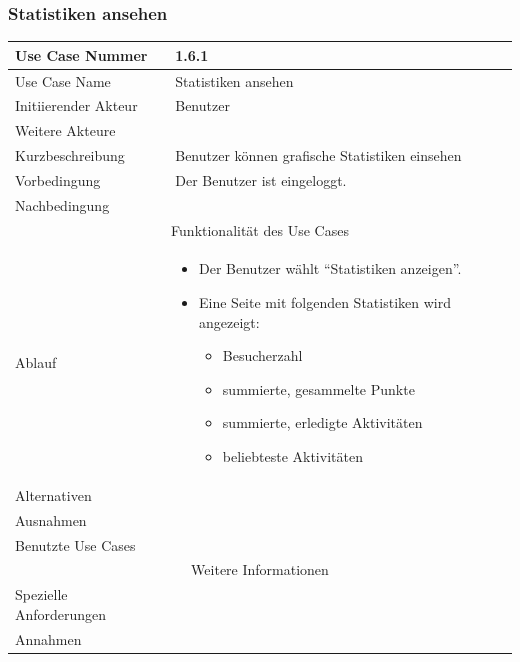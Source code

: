 \documentclass[10pt,a4paper]{article}
\begin{document}
\subsubsection{Statistiken ansehen}
	\begin{tabular}{|l|p{.5\linewidth}|}
	\hline Use Case Nummer & 1.6.1\\ 
	\hline Use Case Name & Statistiken ansehen \\ 
	\hline Initiierender Akteur & Benutzer \\
	\hline Weitere Akteure &  \\
	\hline Kurzbeschreibung & Benutzer können grafische Statistiken einsehen \\
	\hline Vorbedingung & Der Benutzer ist eingeloggt. \\
	\hline Nachbedingung &   \\
	\hline \multicolumn{2}{|c|}{Funktionalität des Use Cases}\\
	\hline Ablauf & \begin{itemize}
		\item Der Benutzer wählt ``Statistiken anzeigen''.
		\item Eine Seite mit folgenden Statistiken wird angezeigt:
                      \begin{itemize}
                      \item Besucherzahl
                      \item summierte, gesammelte Punkte
                      \item summierte, erledigte Aktivitäten
                      \item beliebteste Aktivitäten
                      \end{itemize}
		\end{itemize} \\
	\hline Alternativen &  \\
	\hline Ausnahmen & \\
	\hline Benutzte Use Cases & \\
	\hline \multicolumn{2}{|c|}{Weitere Informationen} \\
	\hline Spezielle Anforderungen &  \\
	\hline Annahmen &  \\
	\hline
	\end{tabular}
\end{document}
